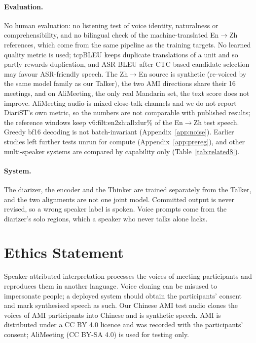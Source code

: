 \paragraph{Evaluation.} No human evaluation: no listening test of voice identity, naturalness or comprehensibility, and
no bilingual check of the machine-translated En$\rightarrow$Zh references, which come from the same pipeline as the
training targets. No learned quality metric is used; tcpBLEU keeps duplicate translations of a unit and so partly rewards
duplication, and ASR-BLEU after CTC-based candidate selection may favour ASR-friendly speech. The Zh$\rightarrow$En
source is synthetic (re-voiced by the same model family as our Talker), the two AMI directions share their 16 meetings,
and on AliMeeting, the only real Mandarin set, the text score does not improve. AliMeeting audio is mixed close-talk
channels and we do not report DiariST's own metric, so the numbers are not comparable with published results; the reference windows keep
\num{v6:filt:en2zh:all:dur}\% of the En$\rightarrow$Zh test speech. Greedy bf16 decoding is not batch-invariant
(Appendix~\ref{app:noise}). Earlier studies left further tests unrun for compute (Appendix~\ref{app:prereg}), and other
multi-speaker systems are compared by capability only (Table~\ref{tab:related8}).

\paragraph{System.} The diarizer, the encoder and the Thinker are trained separately from the Talker, and the two
alignments are not one joint model. Committed output is never revised, so a wrong speaker label is spoken. Voice prompts
come from the diarizer's solo regions, which a speaker who never talks alone lacks.

\section*{Ethics Statement}

Speaker-attributed interpretation processes the voices of meeting participants and reproduces them in another
language. Voice cloning can be misused to impersonate people; a deployed system should obtain the participants'
consent and mark synthesised speech as such. Our Chinese AMI test audio clones the voices of AMI participants into
Chinese and is synthetic speech. AMI is distributed under a CC BY 4.0 licence and was recorded with the participants'
consent; AliMeeting (CC BY-SA 4.0) is used for testing only.
